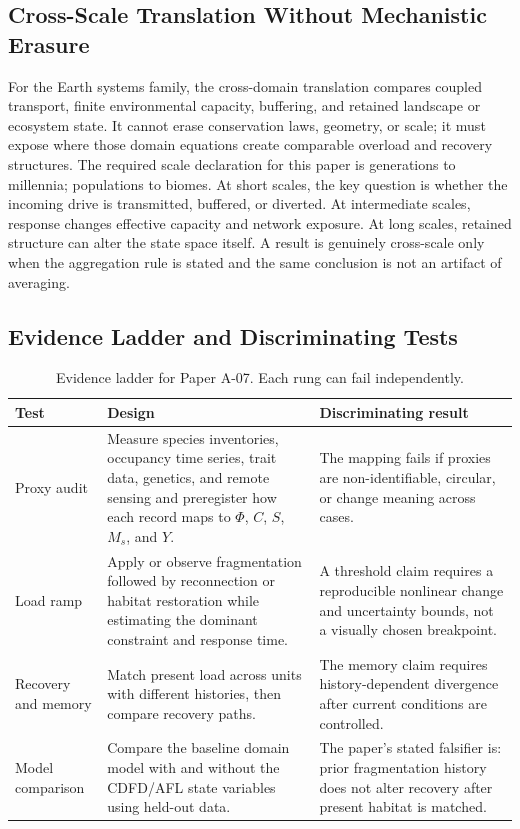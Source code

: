 \documentclass[11pt,a4paper]{article}
\begin{document}
\subsection{Cross-Scale Translation Without Mechanistic Erasure}

For the Earth systems family, the cross-domain translation compares coupled transport, finite environmental capacity, buffering, and retained landscape or ecosystem state. It cannot erase conservation laws, geometry, or scale; it must expose where those domain equations create comparable overload and recovery structures. \cite{Holling1973,Turing1952,BakTangWiesenfeld1987}
The required scale declaration for this paper is generations to millennia; populations to biomes. At short
scales, the key question is whether the incoming drive is transmitted,
buffered, or diverted. At intermediate scales, response changes effective
capacity and network exposure. At long scales, retained structure can alter the
state space itself. A result is genuinely cross-scale only when the aggregation
rule is stated and the same conclusion is not an artifact of averaging.

\subsection{Evidence Ladder and Discriminating Tests}

\begin{table}[htbp]
\centering
\small
\caption{Evidence ladder for Paper A-07. Each rung can fail independently.}
\begin{tabularx}{\textwidth}{|p{}|X|X|}
\hline
\textbf{Test} & \textbf{Design} & \textbf{Discriminating result} \\
\hline
Proxy audit & Measure species inventories, occupancy time series, trait data, genetics, and remote sensing and preregister how each record maps to $\Phi$, $C$, $S$, $M_s$, and $Y$. & The mapping fails if proxies are non-identifiable, circular, or change meaning across cases. \\
\hline
Load ramp & Apply or observe fragmentation followed by reconnection or habitat restoration while estimating the dominant constraint and response time. & A threshold claim requires a reproducible nonlinear change and uncertainty bounds, not a visually chosen breakpoint. \\
\hline
Recovery and memory & Match present load across units with different histories, then compare recovery paths. & The memory claim requires history-dependent divergence after current conditions are controlled. \\
\hline
Model comparison & Compare the baseline domain model with and without the CDFD/AFL state variables using held-out data. & The paper's stated falsifier is: prior fragmentation history does not alter recovery after present habitat is matched. \\
\hline
\end{tabularx}
\end{table}
\end{document}
